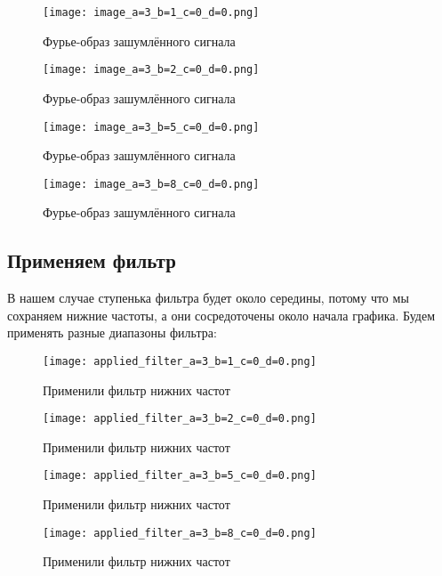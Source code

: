 \begin{figure}[ht]
    \centering
    \texttt{[image: image\_a=3\_b=1\_c=0\_d=0.png]}
    \caption{Фурье-образ зашумлённого сигнала}
\end{figure}

\begin{figure}[ht]
    \centering
    \texttt{[image: image\_a=3\_b=2\_c=0\_d=0.png]}
    \caption{Фурье-образ зашумлённого сигнала}
\end{figure}

\begin{figure}[ht]
    \centering
    \texttt{[image: image\_a=3\_b=5\_c=0\_d=0.png]}
    \caption{Фурье-образ зашумлённого сигнала}
\end{figure}

\begin{figure}[ht]
    \centering
    \texttt{[image: image\_a=3\_b=8\_c=0\_d=0.png]}
    \caption{Фурье-образ зашумлённого сигнала}
\end{figure}

\newpage
\subsection{Применяем фильтр}
В нашем случае ступенька фильтра будет около середины, потому что мы сохраняем нижние частоты, а они сосредоточены около начала графика. Будем применять разные диапазоны фильтра:

\begin{figure}[ht]
    \centering
    \texttt{[image: applied\_filter\_a=3\_b=1\_c=0\_d=0.png]}
    \caption{Применили фильтр нижних частот}
\end{figure}

\begin{figure}[ht]
    \centering
    \texttt{[image: applied\_filter\_a=3\_b=2\_c=0\_d=0.png]}
    \caption{Применили фильтр нижних частот}
\end{figure}

\begin{figure}[ht]
    \centering
    \texttt{[image: applied\_filter\_a=3\_b=5\_c=0\_d=0.png]}
    \caption{Применили фильтр нижних частот}
\end{figure}

\begin{figure}[ht]
    \centering
    \texttt{[image: applied\_filter\_a=3\_b=8\_c=0\_d=0.png]}
    \caption{Применили фильтр нижних частот}
\end{figure}

